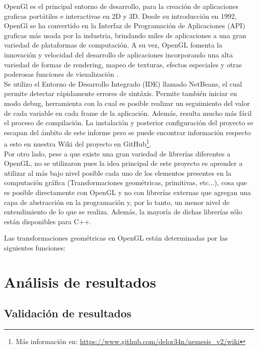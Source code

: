\documentclass[journal]{IEEEtran}
\begin{document}
OpenGl es el principal entorno de desarrollo, para la creación de aplicaciones graficas portátiles e interactivas en  2D y 3D. Desde su introducción en 1992, OpenGl se ha convertido en la Interfaz de Programación de Aplicaciones (API) graficas más usada por la industria, brindando miles de aplicaciones a una gran variedad de plataformas de computación. A su vez, OpenGL fomenta la innovación y velocidad del desarrollo de aplicaciones incorporando una alta variedad de formas de rendering, mapeo de texturas, efectos especiales y otras poderosas funciones de visualización \cite{opengl}.\\

Se utilizo el Entorno de Desarrollo Integrado (IDE) llamado NetBeans, el cual permite detectar rápidamente errores de sintáxis. Permite también iniciar en modo debug, herramienta con la cual es posible realizar un seguimiento del valor de cada variable en cada frame de la aplicación. Además, resulta mucho más fácil el proceso de compilación. La instalación y posterior configuración del proyecto se escapan del ámbito de este informe pero se puede encontrar información respecto a esto en nuestra Wiki del proyecto en GitHub\footnote{Más información en: \url{https://www.github.com/delor34n/nemesis_v2/wiki}}.\\

Por otro lado, pese a que existe una gran variedad de librerías diferentes a OpenGL, no se utilizaron pues la idea principal de este proyecto es aprender a utilizar al más bajo nivel posible cada uno de los elementos presentes en la computación gráfica (Transformaciones geométricas, primitivas, etc...), cosa que es posible directamente con OpenGL y no con librerías externas que agregan una capa de abstracción en la programación y, por lo tanto, un menor nivel de entendimiento de lo que se realiza. Además, la mayoría de dichas librerías sólo están disponibles para C++.

Las transformaciones geométricas en OpenGL están determinadas por las siguientes funciones:



\section{Análisis de resultados}

\subsection{Validación de resultados}
\end{document}
